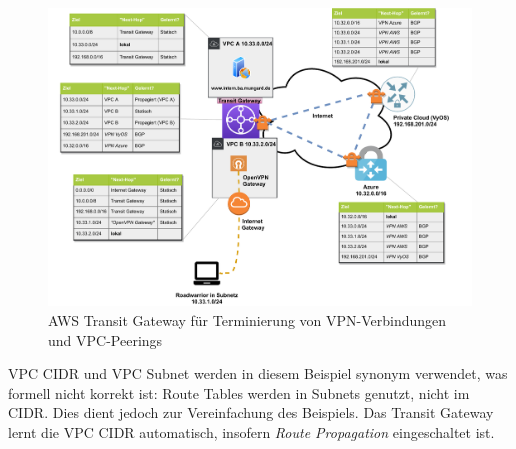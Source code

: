 \begin{figure}[h]
  \centering
  \includegraphics[scale=0.75]{Figures/Use-Case-2_AWS_TGW_Route-Tables.pdf}
  \caption{AWS Transit Gateway für Terminierung von VPN-Verbindungen und VPC-Peerings}
  \label{grafik:aws_tgw_route_tables}
\end{figure}\FloatBarrier
VPC \gls{CIDR} und \gls{VPC} Subnet werden in diesem Beispiel synonym verwendet, was formell nicht korrekt ist: Route Tables werden in Subnets genutzt, nicht im \gls{CIDR}. Dies dient jedoch zur Vereinfachung des Beispiels. Das Transit Gateway lernt die \gls{VPC} \gls{CIDR} automatisch, insofern \textit{Route Propagation} eingeschaltet ist.
\newpage
